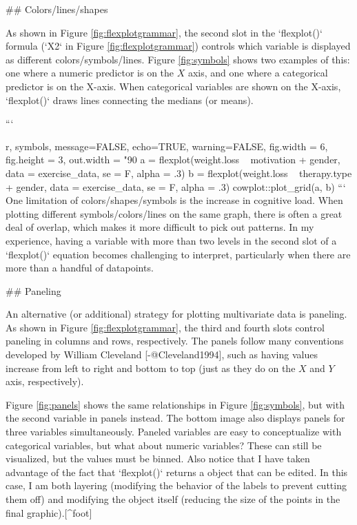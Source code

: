 {{{{{{{{## Colors/lines/shapes

As shown in Figure \ref{fig:flexplotgrammar}, the second slot in the `flexplot()` formula (`X2` in Figure \ref{fig:flexplotgrammar}) controls which variable is displayed as different colors/symbols/lines. Figure \ref{fig:symbols} shows two examples of this: one where a numeric predictor is on the $X$ axis, and one where a categorical predictor is on the X-axis. When categorical variables are shown on the X-axis, `flexplot()` draws lines connecting the medians (or means). 

```{r, symbols, message=FALSE, echo=TRUE, warning=FALSE, fig.width = 6, fig.height = 3, out.width = "90%
a = flexplot(weight.loss ~ motivation + gender, 
    data = exercise_data, se = F, alpha = .3)
b = flexplot(weight.loss ~ therapy.type + gender, 
    data = exercise_data, se = F, alpha = .3)
cowplot::plot_grid(a, b)
```
One limitation of colors/shapes/symbols is the increase in cognitive load. When plotting different symbols/colors/lines on the same graph, there is often a great deal of overlap, which makes it more difficult to pick out patterns. In my experience, having a variable with more than two levels in the second slot of a `flexplot()` equation becomes challenging to interpret, particularly when there are more than a handful of datapoints. 

## Paneling

An alternative (or additional) strategy for plotting multivariate data is paneling. As shown in Figure \ref{fig:flexplotgrammar}, the third and fourth slots control paneling in columns and rows, respectively. The panels follow many conventions developed by William Cleveland [-@Cleveland1994], such as having values increase from left to right and bottom to top (just as they do on the $X$ and $Y$ axis, respectively). 

Figure \ref{fig:panels} shows the same relationships in Figure \ref{fig:symbols}, but with the second variable in panels instead. The bottom image also displays panels for three variables simultaneously. Paneled variables are easy to conceptualize with categorical variables, but what about numeric variables? These can still be visualized, but the values must be binned. Also notice that I have taken advantage of the fact that `flexplot()` returns a  object that can be edited. In this case, I am both layering (modifying the behavior of the labels to prevent cutting them off) and modifying the  object itself (reducing the size of the points in the final graphic).[^foot]

}}}}}}}}}
